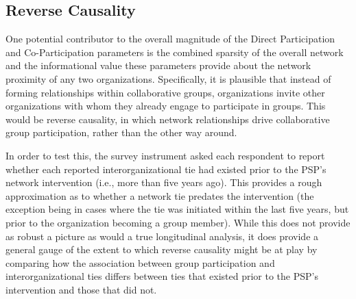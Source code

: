 \documentclass[12pt,a4paper,titlepage]{article}
\begin{document}
\subsection{Reverse Causality}



One potential contributor to the overall magnitude of the Direct Participation and Co-Participation parameters is the combined sparsity of the overall network and the informational value these parameters provide about the network proximity of any two organizations. Specifically, it is plausible that instead of forming relationships within collaborative groups, organizations invite other organizations with whom they already engage to participate in groups. This would be reverse causality, in which network relationships drive collaborative group participation, rather than the other way around.

In order to test this, the survey instrument asked each respondent to report whether each reported interorganizational tie had existed prior to the PSP’s network intervention (i.e., more than five years ago). This provides a rough approximation as to whether a network tie predates the intervention (the exception being in cases where the tie was initiated within the last five years, but prior to the organization becoming a group member). While this does not provide as robust a picture as would a true longitudinal analysis, it does provide a general gauge of the extent to which reverse causality might be at play by comparing how the association between group participation and interorganizational ties differs between ties that existed prior to the PSP’s intervention and those that did not.
\end{document}
